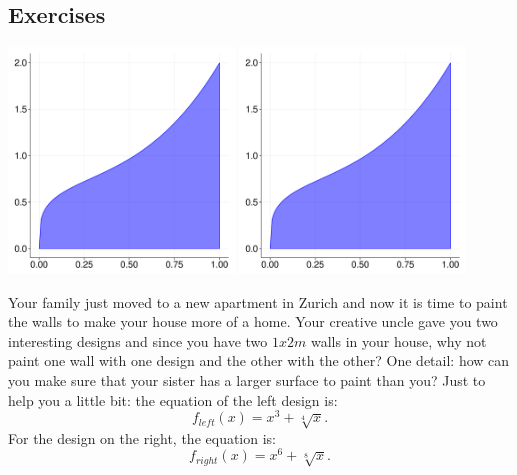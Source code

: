 \documentclass[a4paper]{report}
\begin{document}
\subsection{Exercises}

\begin{Exercise}[title=Painting a wall, difficulty=1,label=ex0202]
\begin{center}
\includegraphics[width=0.45\textwidth,page=1]{ex_int.pdf}
\includegraphics[width=0.45\textwidth,page=2]{ex_int.pdf}
\end{center}
Your family just moved to a new apartment in Zurich and now it is time to paint the walls to make your house more of a home. Your creative uncle gave you two interesting designs and since you have two $1x2 m$ walls in your house, why not paint one wall with one design and the other with the other? One detail: how can you make sure that your sister has a larger surface to paint than you? Just to help you a little bit: the equation of the left design is:
\begin{equation*}
f_{left}(x) = x^3 + \sqrt[4]{x}.
\end{equation*}
For the design on the right, the equation is:
\begin{equation*}
f_{right}(x) = x^6 + \sqrt[8]{x}.
\end{equation*}
\end{Exercise}
\end{document}
